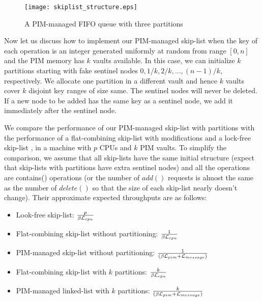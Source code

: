 \documentclass[11pt, letterpaper]{article}   	%
\newcommand{\latpim} {\mathcal{L}_{pim}}
\newcommand{\latcpu} {\mathcal{L}_{cpu}}
\newcommand{\latmes} {\mathcal{L}_{message}}
\begin{document}
\begin{figure}[ht!]
\centering
\texttt{[image: skiplist\_structure.eps]}
\caption{A PIM-managed FIFO queue with three partitions}
\label{figure:skiplist_structure}
\end{figure}

Now let us discuss how to implement our PIM-managed skip-list
when the key of each operation is an integer generated uniformly at random
from range $[0, n]$ and the PIM memory has $k$ vaults available.
In this case, we can initialize $k$ partitions starting with fake sentinel nodes
$0, 1/k, 2/k,..., (n-1)/k$, respectively.
We allocate one partition in a different vault and hence $k$ vaults cover
$k$ disjoint key ranges of size same.
The sentinel nodes will never be deleted.
If a new node to be added has the same key as a sentinel node,
we add it immediately after the sentinel node.

We compare the performance of our PIM-managed skip-list with partitions 
with the performance of a flat-combining skip-list \cite{Hendler10} with modifications
and a lock-free skip-list \cite{Herlihy08}, 
in a machine with $p$ CPUs and $k$ PIM vaults.
To simplify the comparison, we assume that all skip-lists have the same
initial structure (expect that skip-lists with partitions have extra sentinel nodes)
and all the operations are contains() operations
(or the number of $add()$ requests is almost the same as the number of $delete()$ 
so that the size of each skip-list nearly doesn't change).
Their approximate expected throughputs are as follows:

\begin{itemize}
\item Look-free skip-list:
	${p \over \beta\latcpu}$

\item Flat-combining skip-list without partitioning:
	${1 \over \beta\latcpu}$

\item PIM-managed skip-list without partitioning:
	${1 \over (\beta\latpim + \latmes)}$

\item Flat-combining skip-list with $k$ partitions:
    ${k \over \beta\latcpu}$

\item PIM-managed linked-list with $k$ partitions:
    ${k \over (\beta\latpim + \latmes)}$
\end{itemize}
\end{document}
